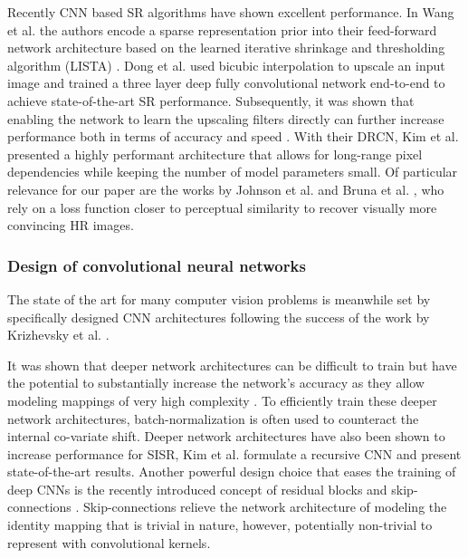 \documentclass[10pt,twocolumn,letterpaper]{article}
\begin{document}
 	Recently \ac{CNN} based \ac{SR} algorithms have shown excellent performance.
 	In Wang et al. \cite{Wang2015} the authors encode a sparse representation prior into their feed-forward network architecture based on the learned iterative shrinkage and thresholding algorithm (LISTA) \cite{gregor2010learning}.
 	Dong et al. \cite{dong2014learning,dong2016image} used bicubic interpolation to upscale an input image and trained a three layer deep fully convolutional network end-to-end to achieve state-of-the-art \ac{SR} performance.
	Subsequently, it was shown that enabling the network to learn the upscaling filters directly can further increase performance both in terms of accuracy and speed \cite{dong2016accelerating,Shi2016ESPCN,Wang2016}. 
 	With their \ac{DRCN}, Kim et al. \cite{kim2016deeply} presented a highly performant architecture that allows for long-range pixel dependencies while keeping the number of model parameters small.
 	Of particular relevance for our paper are the works by Johnson et al. \cite{Johnson16PercepLoss} and Bruna et al. \cite{bruna2016super}, who rely on a loss function closer to perceptual similarity to recover visually more convincing \ac{HR} images.
 
  
\subsubsection{Design of convolutional neural networks}
	The state of the art for many computer vision problems is meanwhile set by specifically designed \ac{CNN} architectures following the success of the work by Krizhevsky et al. \cite{krizhevsky2012imagenet}. 
	
	It was shown that deeper network architectures can be difficult to train but have the potential to substantially increase the network's accuracy as they allow modeling mappings of very high complexity \cite{simonyan2014very,szegedy2015going}. To efficiently train these deeper network architectures, batch-normalization \cite{Ioffe2015} is often used to counteract the internal co-variate shift.
	Deeper network architectures have also been shown to increase performance for \ac{SISR}, \eg Kim et al. \cite{kim2016deeply} formulate a recursive \ac{CNN} and present state-of-the-art results.
	Another powerful design choice that eases the training of deep \ac{CNN}s is the recently introduced concept of residual blocks \cite{he2015deep} and skip-connections \cite{he2016identity,kim2016deeply}. Skip-connections relieve the network architecture of modeling the identity mapping that is trivial in nature, however, potentially non-trivial to represent with convolutional kernels.
	
\end{document}
